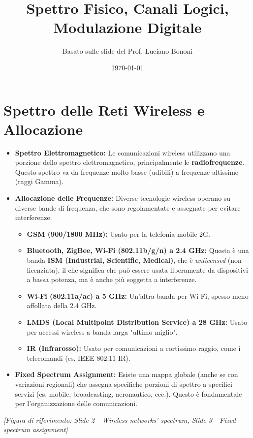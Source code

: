 



\title{Spettro Fisico, Canali Logici, Modulazione Digitale}
\author{Basato sulle slide del Prof. Luciano Bononi}
\date{\today}



\maketitle
\tableofcontents
\newpage

\section{Spettro delle Reti Wireless e Allocazione}

\begin{itemize}
    \item \textbf{Spettro Elettromagnetico:} Le comunicazioni wireless utilizzano una porzione dello spettro elettromagnetico, principalmente le \textbf{radiofrequenze}. Questo spettro va da frequenze molto basse (udibili) a frequenze altissime (raggi Gamma).
    \item \textbf{Allocazione delle Frequenze:} Diverse tecnologie wireless operano su diverse bande di frequenza, che sono regolamentate e assegnate per evitare interferenze.
    \begin{itemize}
        \item \textbf{GSM (900/1800 MHz):} Usato per la telefonia mobile 2G.
        \item \textbf{Bluetooth, ZigBee, Wi-Fi (802.11b/g/n) a 2.4 GHz:} Questa è una banda \textbf{ISM (Industrial, Scientific, Medical)}, che è \textit{unlicensed} (non licenziata), il che significa che può essere usata liberamente da dispositivi a bassa potenza, ma è anche più soggetta a interferenze.
        \item \textbf{Wi-Fi (802.11a/ac) a 5 GHz:} Un'altra banda per Wi-Fi, spesso meno affollata della 2.4 GHz.
        \item \textbf{LMDS (Local Multipoint Distribution Service) a 28 GHz:} Usato per accessi wireless a banda larga "ultimo miglio".
        \item \textbf{IR (Infrarosso):} Usato per comunicazioni a cortissimo raggio, come i telecomandi (es. IEEE 802.11 IR).
    \end{itemize}
    \item \textbf{Fixed Spectrum Assignment:} Esiste una mappa globale (anche se con variazioni regionali) che assegna specifiche porzioni di spettro a specifici servizi (es. mobile, broadcasting, aeronautico, ecc.). Questo è fondamentale per l'organizzazione delle comunicazioni.
\end{itemize}
\textit{[Figura di riferimento: Slide 2 - Wireless networks' spectrum, Slide 3 - Fixed spectrum assignment]}

